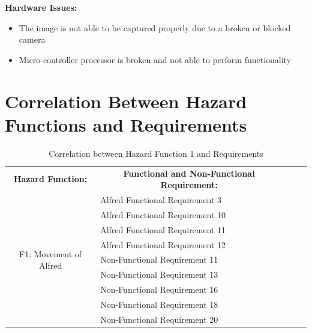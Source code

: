 \documentclass [10pt]{article}
\begin{document}
	\textbf{Hardware Issues:}
		\begin {itemize}
			\item The image is not able to be captured properly due to a broken or blocked camera
			\item Micro-controller processor is broken and not able to perform functionality
		\end {itemize}


\pagebreak 



\section{Correlation Between Hazard Functions and  Requirements}


\begin{table}[H]
\centering
\begin{tabular}{|c|l|lll}
\cline{1-2}
\textbf{Hazard Function:} & \multicolumn{1}{c|}{\textbf{Functional and Non-Functional Requirement:}} &  &  &  \\ \cline{1-2}
\multirow{9}{*}{F1: Movement of Alfred} 
				& Alfred Functional Requirement 3		&  &  &  \\ \cline{2-2}
                                  & Alfred Functional Requirement 10		&  &  &  \\ \cline{2-2}
                                  & Alfred Functional Requirement 11		&  &  &  \\ \cline{2-2}
                                  & Alfred Functional Requirement 12		&  &  &  \\ \cline{2-2}
                                  & Non-Functional Requirement 11		&  &  &  \\ \cline{2-2}
                                  & Non-Functional Requirement 13 		&  &  &  \\ \cline{2-2}
                                  & Non-Functional Requirement 16 		&  &  &  \\ \cline{2-2}
                                  & Non-Functional Requirement 18		&  &  &  \\ \cline{2-2}
                                  & Non-Functional Requirement 20		&  &  &  \\ \cline{1-2}
\end{tabular}
\caption{Correlation between Hazard Function 1 and Requirements}  
\end{table}
\end{document}
